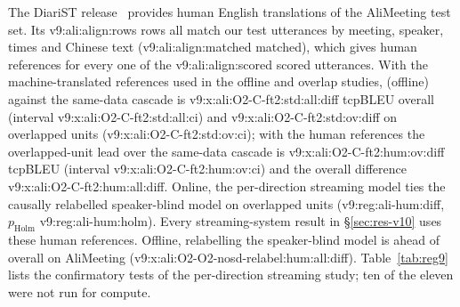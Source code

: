 The DiariST release~\citep{yang2024diarist} provides human English translations of the AliMeeting test set. Its
\num{v9:ali:align:rows} rows all match our test utterances by meeting, speaker, times and Chinese text
(\num{v9:ali:align:matched} matched), which gives human references for every one of the \num{v9:ali:align:scored} scored
utterances. With the machine-translated references used in the offline and overlap studies, \sys{} (offline) against the same-data cascade is
\num{v9:x:ali:O2-C-ft2:std:all:diff} tcpBLEU overall (interval \num{v9:x:ali:O2-C-ft2:std:all:ci}) and
\num{v9:x:ali:O2-C-ft2:std:ov:diff} on overlapped units (\num{v9:x:ali:O2-C-ft2:std:ov:ci}); with the human references
the overlapped-unit lead over the same-data cascade is \num{v9:x:ali:O2-C-ft2:hum:ov:diff} tcpBLEU (interval
\num{v9:x:ali:O2-C-ft2:hum:ov:ci}) and the overall difference \num{v9:x:ali:O2-C-ft2:hum:all:diff}. Online, the
per-direction streaming model ties the causally relabelled speaker-blind model on overlapped units
(\num{v9:reg:ali-hum:diff}, $p_\text{Holm}$ \num{v9:reg:ali-hum:holm}). Every streaming-system result in
\S\ref{sec:res-v10} uses these human references. Offline, relabelling the speaker-blind model is ahead of
\sys{} overall on AliMeeting (\num{v9:x:ali:O2-O2-nosd-relabel:hum:all:diff}). Table~\ref{tab:reg9} lists the
confirmatory tests of the per-direction streaming study; ten of the eleven were not run for compute.


